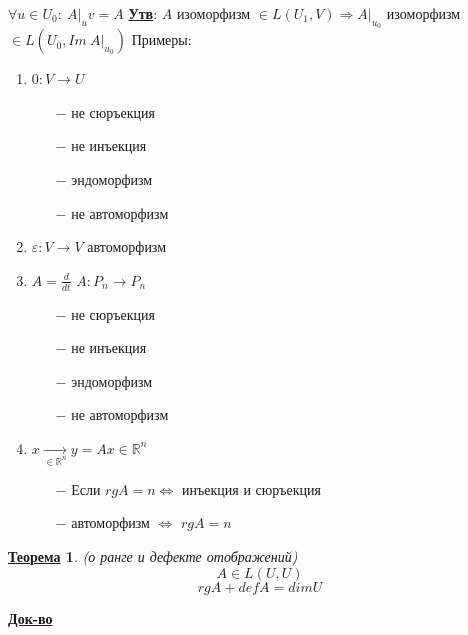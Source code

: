 \documentclass[12pt,a4paper]{article}
\newcommand{\bfline}[1]{\textbf{\underline{#1}}}
\newcommand{\R}{\mathbb{R}}
\newtheorem*{theorem*}{\bfline{Теорема}}
\begin{document}
$\forall u \in U_0:\  A|_{u} v = A$ \newline
\bfline{Утв}: $A$ изоморфизм $\in L(U_1, V) \Rightarrow A|_{u_0}$ изоморфизм $\in L (U_0, Im\ A|_{u_0})$ \newline
Примеры:
\begin{enumerate}
	\item $0: V \rightarrow U$
		\begin{enumerate}
			\item[$-$] не сюръекция
			\item[$-$] не инъекция
			\item[$-$] эндоморфизм
			\item[$-$] не автоморфизм
		\end{enumerate}
	\item $\varepsilon: V \rightarrow V$ автоморфизм
	\item $A = \frac{d}{dt}$ $A: P_n \rightarrow P_n$
		\begin{enumerate}
			\item[$-$] не сюръекция
			\item[$-$] не инъекция
			\item[$-$] эндоморфизм
			\item[$-$] не автоморфизм
		\end{enumerate}
	\item $x \underset{\in \R^n}{\rightarrow} y = Ax \in \R^n$
		\begin{enumerate}
			\item[$-$] Если $rg A = n \Leftrightarrow$ инъекция и сюръекция
			\item[$-$] автоморфизм $\Leftrightarrow$ $rg A = n$
		\end{enumerate}
\end{enumerate}
\begin{theorem*}{(о ранге и дефекте отображений) \newline}
	$$A \in L(U, U)$$
	$$rg A + def A = dim U$$
\end{theorem*}
\bfline{Док-во}
\end{document}
